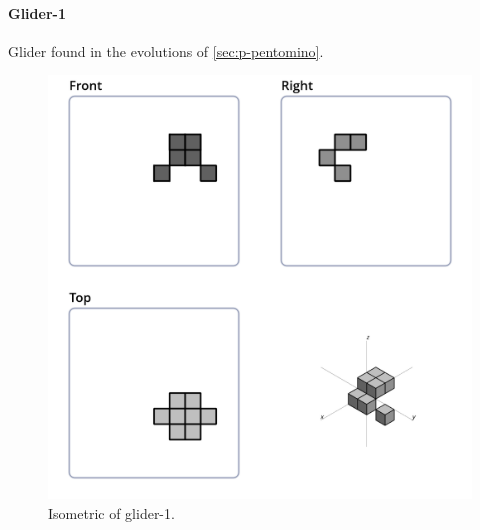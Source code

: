 \paragraph{Glider-1}
Glider found in the evolutions of \ref{sec:p-pentomino}.
\begin{figure}
	\centering
	\includegraphics[scale=0.3]{iso_settings/glider_1.png}
	\caption{Isometric of glider-1.}
  \label{fig:iso-glider-1}
\end{figure}

